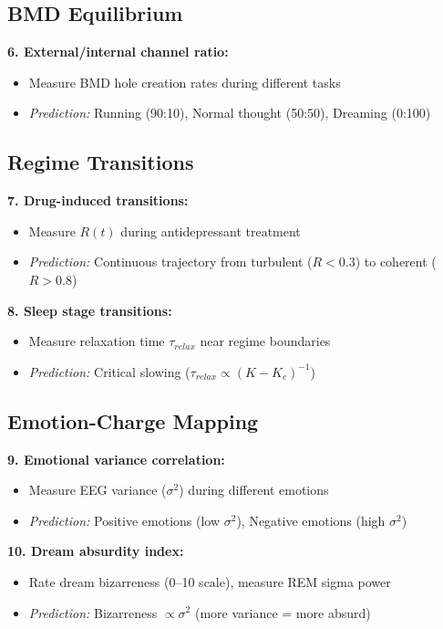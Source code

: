 \documentclass[12pt,a4paper]{article}
\begin{document}
\subsection{BMD Equilibrium}

\textbf{6. External/internal channel ratio:}
\begin{itemize}
\item Measure BMD hole creation rates during different tasks
\item \textit{Prediction:} Running (90:10), Normal thought (50:50), Dreaming (0:100)
\end{itemize}

\subsection{Regime Transitions}

\textbf{7. Drug-induced transitions:}
\begin{itemize}
\item Measure $R(t)$ during antidepressant treatment
\item \textit{Prediction:} Continuous trajectory from turbulent ($R < 0.3$) to coherent ($R > 0.8$)
\end{itemize}

\textbf{8. Sleep stage transitions:}
\begin{itemize}
\item Measure relaxation time $\tau_{relax}$ near regime boundaries
\item \textit{Prediction:} Critical slowing ($\tau_{relax} \propto (K - K_c)^{-1}$)
\end{itemize}

\subsection{Emotion-Charge Mapping}

\textbf{9. Emotional variance correlation:}
\begin{itemize}
\item Measure EEG variance ($\sigma^2$) during different emotions
\item \textit{Prediction:} Positive emotions (low $\sigma^2$), Negative emotions (high $\sigma^2$)
\end{itemize}

\textbf{10. Dream absurdity index:}
\begin{itemize}
\item Rate dream bizarreness (0--10 scale), measure REM sigma power
\item \textit{Prediction:} Bizarreness $\propto \sigma^2$ (more variance = more absurd)
\end{itemize}
\end{document}
